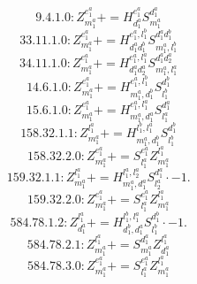 \documentclass[letterpaper,10pt,fleqn,leqno,onecolumn]{article}
\begin{document}
\begin{equation} \;\;\;\;\;\;  9.4.1.0: Z^{e_{1}^{a}}_{m_{1}^{a}}+=H^{e_{1}^{a}}_{d_{1}^{a}}S^{d_{1}^{a}}_{m_{1}^{a}} \end{equation}
\begin{equation} \;\;\;\;\;\;  33.11.1.0: Z^{e_{1}^{a}}_{m_{1}^{a}}+=H^{e_{1}^{a},l_{1}^{b}}_{d_{1}^{a}d_{1}^{b}}S^{d_{1}^{a}d_{1}^{b}}_{m_{1}^{a},l_{1}^{b}} \end{equation}
\begin{equation} \;\;\;\;\;\;  34.11.1.0: Z^{e_{1}^{a}}_{m_{1}^{a}}+=H^{e_{1}^{a},l_{1}^{a}}_{d_{1}^{a}d_{2}^{a}}S^{d_{1}^{a}d_{2}^{a}}_{m_{1}^{a},l_{1}^{a}} \end{equation}
\begin{equation} \;\;\;\;\;\;  14.6.1.0: Z^{e_{1}^{a}}_{m_{1}^{a}}+=H^{e_{1}^{a},l_{1}^{b}}_{m_{1}^{a},d_{1}^{b}}S^{d_{1}^{b}}_{l_{1}^{b}} \end{equation}
\begin{equation} \;\;\;\;\;\;  15.6.1.0: Z^{e_{1}^{a}}_{m_{1}^{a}}+=H^{e_{1}^{a},l_{1}^{a}}_{m_{1}^{a},d_{1}^{a}}S^{d_{1}^{a}}_{l_{1}^{a}} \end{equation}
\begin{equation} \;\;\;\;\;\;  158.32.1.1: Z^{l_{1}^{a}}_{m_{1}^{a}}+=H^{l_{1}^{b},l_{1}^{a}}_{m_{1}^{a},d_{1}^{b}}S^{d_{1}^{b}}_{l_{1}^{b}} \end{equation}
\begin{equation} \;\;\;\;\;\;  158.32.2.0: Z^{e_{1}^{a}}_{m_{1}^{a}}+=S^{e_{1}^{a}}_{l_{1}^{a}}Z^{l_{1}^{a}}_{m_{1}^{a}} \end{equation}
\begin{equation} \;\;\;\;\;\;  159.32.1.1: Z^{l_{1}^{a}}_{m_{1}^{a}}+=H^{l_{1}^{a},l_{2}^{a}}_{m_{1}^{a},d_{1}^{a}}S^{d_{1}^{a}}_{l_{2}^{a}}\cdot -1. \end{equation}
\begin{equation} \;\;\;\;\;\;  159.32.2.0: Z^{e_{1}^{a}}_{m_{1}^{a}}+=S^{e_{1}^{a}}_{l_{1}^{a}}Z^{l_{1}^{a}}_{m_{1}^{a}} \end{equation}
\begin{equation} \;\;\;\;\;\;  584.78.1.2: Z^{l_{1}^{a}}_{d_{1}^{a}}+=H^{l_{1}^{b},l_{1}^{a}}_{d_{1}^{b},d_{1}^{a}}S^{d_{1}^{b}}_{l_{1}^{b}}\cdot -1. \end{equation}
\begin{equation} \;\;\;\;\;\;  584.78.2.1: Z^{l_{1}^{a}}_{m_{1}^{a}}+=S^{d_{1}^{a}}_{m_{1}^{a}}Z^{l_{1}^{a}}_{d_{1}^{a}} \end{equation}
\begin{equation} \;\;\;\;\;\;  584.78.3.0: Z^{e_{1}^{a}}_{m_{1}^{a}}+=S^{e_{1}^{a}}_{l_{1}^{a}}Z^{l_{1}^{a}}_{m_{1}^{a}} \end{equation}
\end{document}
